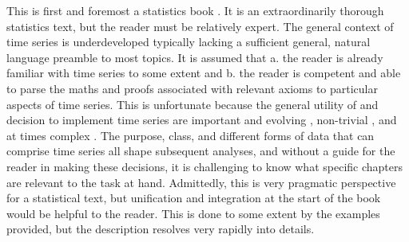 \documentclass[bookreview]{jss}
\begin{document}
This is first and foremost a statistics book \citep{Woodward2017}. It is an extraordinarily thorough statistics text, but the reader must be relatively expert. The general context of time series is underdeveloped typically lacking a sufficient general, natural language preamble to most topics. It is assumed that a. the reader is already familiar with time series to some extent and b. the reader is competent and able to parse the maths and proofs associated with relevant axioms to particular aspects of time series. This is unfortunate because the general utility of and decision to implement time series are important and evolving \citep{Mishra2017}, non-trivial \citep{Webby1996}, and at times complex \citep{Fu2011, Tang2015}. The purpose, class, and different forms of data that can comprise time series all shape subsequent analyses, and without a guide for the reader in making these decisions, it is challenging to know what specific chapters are relevant to the task at hand. Admittedly, this is very pragmatic perspective for a statistical text, but unification and integration at the start of the book would be helpful to the reader. This is done to some extent by the examples provided, but the description resolves very rapidly into details. \newline
\end{document}
